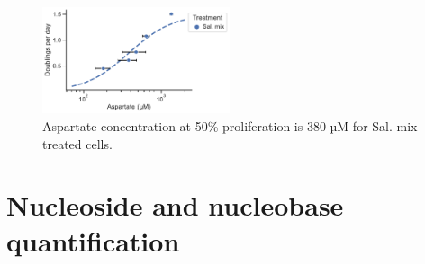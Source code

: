 \begin{figure}
    \centering
    \includegraphics[width=0.49\textwidth]{figures/chap2/app/143B_Met_Asp_vs_prlfr.pdf}
    \caption[ggggg]{
    Aspartate concentration at 50\% proliferation is 380 µM for Sal. mix treated cells.
    }
    \label{fig:app_ch2:143B_Met_Asp_vs_prlfr}
\end{figure}









\section{Nucleoside and nucleobase quantification}

